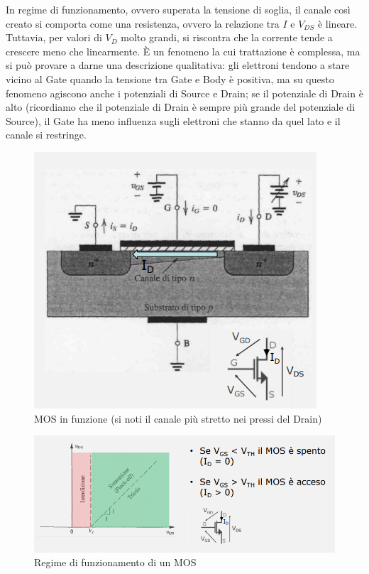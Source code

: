 \documentclass{article}
\begin{document}
\vspace{3mm}

In regime di funzionamento, ovvero superata la tensione di soglia, il canale così creato si comporta come una resistenza, ovvero la relazione tra $I$ e $V_{DS}$ è lineare. Tuttavia, per valori di $V_D$ molto grandi, si riscontra che la corrente tende a crescere meno che linearmente. È un fenomeno la cui trattazione è complessa, ma si può provare a darne una descrizione qualitativa: gli elettroni tendono a stare vicino al Gate quando la tensione tra Gate e Body è positiva, ma su questo fenomeno agiscono anche i potenziali di Source e Drain; se il potenziale di Drain è alto (ricordiamo che il potenziale di Drain è sempre più grande del potenziale di Source), il Gate ha meno influenza sugli elettroni che stanno da quel lato e il canale si restringe.
\clearpage 
\begin{figure}[h]
  \centering
  \includegraphics[scale=0.7]{IM_MOS_ter}
  \caption{MOS in funzione (si noti il canale più stretto nei pressi del Drain)}
  \label{Schema_MOS_ter}
\end{figure}

\begin{figure}[h]
  \centering
  \includegraphics[scale=0.7]{IM_MOS_Funzionamento}
  \caption{Regime di funzionamento di un MOS}
  \label{Schema_MOS_Funzionamento}
\end{figure}
\end{document}
